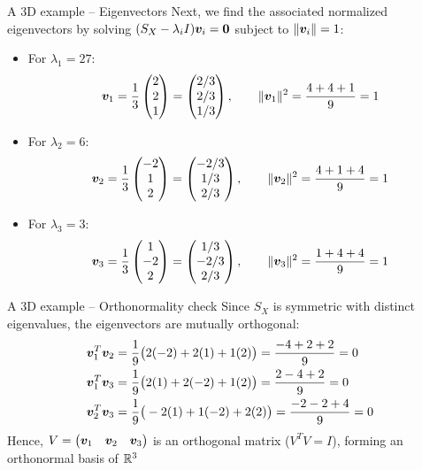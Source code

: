 \documentclass[aspectratio=169]{beamer}\usepackage[]{graphicx}\usepackage[]{xcolor}
\begin{document}
\begin{frame}{A 3D example -- Eigenvectors}
Next, we find the associated normalized eigenvectors by solving $(S_X - \lambda_i I)\bv_i = \b0$ subject to $\|\bm{v}_i\| = 1$:
\vfill
\begin{itemize}
    \item For $\lambda_1 = 27$:
    \[
    \bm{v}_1 = \frac{1}{3}\begin{pmatrix} 2 \\ 2 \\ 1 \end{pmatrix} = \begin{pmatrix} 2/3 \\ 2/3 \\ 1/3 \end{pmatrix}, \qquad \|\bm{v}_1\|^2 = \frac{4+4+1}{9} = 1
    \]
    \item For $\lambda_2 = 6$:
    \[
    \bm{v}_2 = \frac{1}{3}\begin{pmatrix} -2 \\ 1 \\ 2 \end{pmatrix} = \begin{pmatrix} -2/3 \\ 1/3 \\ 2/3 \end{pmatrix}, \qquad \|\bm{v}_2\|^2 = \frac{4+1+4}{9} = 1
    \]
    \item For $\lambda_3 = 3$:
    \[
    \bm{v}_3 = \frac{1}{3}\begin{pmatrix} 1 \\ -2 \\ 2 \end{pmatrix} = \begin{pmatrix} 1/3 \\ -2/3 \\ 2/3 \end{pmatrix}, \qquad \|\bm{v}_3\|^2 = \frac{1+4+4}{9} = 1
    \]
\end{itemize}
\end{frame}


\begin{frame}{A 3D example -- Orthonormality check}
Since $S_X$ is symmetric with distinct eigenvalues, the eigenvectors are mutually orthogonal:
\begin{align*}
\bm{v}_1^T\bm{v}_2 &= \frac{1}{9}\big(2(-2) + 2(1) + 1(2)\big) = \frac{-4 + 2 + 2}{9} = 0 \\
\bm{v}_1^T\bm{v}_3 &= \frac{1}{9}\big(2(1) + 2(-2) + 1(2)\big) = \frac{2 - 4 + 2}{9} = 0 \\
\bm{v}_2^T\bm{v}_3 &= \frac{1}{9}\big(-2(1) + 1(-2) + 2(2)\big) = \frac{-2 - 2 + 4}{9} = 0
\end{align*}
\vfill
Hence, $V = \begin{pmatrix} \bm{v}_1 & \bm{v}_2 & \bm{v}_3 \end{pmatrix}$ is an orthogonal matrix ($V^TV = I$), forming an orthonormal basis of $\mathbb{R}^3$
\end{frame}
\end{document}
